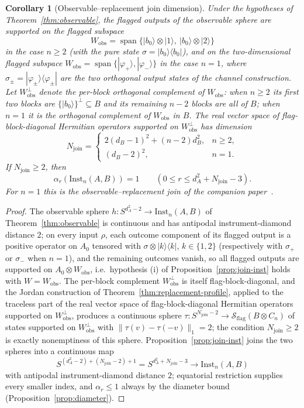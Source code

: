 \documentclass[11pt,a4paper]{article}
\newtheorem{corollary}[theorem]{Corollary}
\newcommand{\Sstate}{\mathcal{S}}
\newcommand{\Inst}{\mathrm{Inst}}
\begin{document}
\begin{corollary}[Observable--replacement join dimension]
\label{cor:join-dimension}
Under the hypotheses of Theorem~\ref{thm:observable}, the flagged outputs of the observable sphere are supported on the flagged subspace
\[
W_{\mathrm{obs}}=\operatorname{span}\{|b_0\rangle\otimes|1\rangle,\ |b_0\rangle\otimes|2\rangle\}
\]
in the case $n\ge2$ (with the pure state $\sigma=|b_0\rangle\langle b_0|$), and on the two-dimensional flagged subspace $W_{\mathrm{obs}}=\operatorname{span}\{|\varphi_+\rangle,|\varphi_-\rangle\}$ in the case $n=1$, where $\sigma_\pm=|\varphi_\pm\rangle\langle\varphi_\pm|$ are the two orthogonal output states of the channel construction. Let $W_{\mathrm{obs}}^{\perp}$ denote the per-block orthogonal complement of $W_{\mathrm{obs}}$: when $n\ge2$ its first two blocks are $\{|b_0\rangle\}^{\perp}\subseteq B$ and its remaining $n-2$ blocks are all of $B$; when $n=1$ it is the orthogonal complement of $W_{\mathrm{obs}}$ in $B$. The real vector space of flag-block-diagonal Hermitian operators supported on $W_{\mathrm{obs}}^{\perp}$ has dimension
\[
N_{\mathrm{join}}=
\begin{cases}
2(d_B-1)^2+(n-2)d_B^2,&n\ge2,\\
(d_B-2)^2,&n=1.
\end{cases}
\]
If $N_{\mathrm{join}}\ge2$, then
\[
\alpha_r(\Inst_n(A,B))=1\qquad(0\le r\le d_A^2+N_{\mathrm{join}}-3).
\]
For $n=1$ this is the observable--replacement join of the companion paper~\cite{CompanionChannels}.
\end{corollary}

\begin{proof}
The observable sphere $h:S^{d_A^2-2}\to\Inst_n(A,B)$ of Theorem~\ref{thm:observable} is continuous and has antipodal instrument-diamond distance $2$; on every input $\rho$, each outcome component of its flagged output is a positive operator on $A_0$ tensored with $\sigma\otimes|k\rangle\langle k|$, $k\in\{1,2\}$ (respectively with $\sigma_+$ or $\sigma_-$ when $n=1$), and the remaining outcomes vanish, so all flagged outputs are supported on $A_0\otimes W_{\mathrm{obs}}$, i.e.\ hypothesis (i) of Proposition~\ref{prop:join-inst} holds with $W=W_{\mathrm{obs}}$. The per-block complement $W_{\mathrm{obs}}^{\perp}$ is itself flag-block-diagonal, and the Jordan construction of Theorem~\ref{thm:replacement-profile}, applied to the traceless part of the real vector space of flag-block-diagonal Hermitian operators supported on $W_{\mathrm{obs}}^{\perp}$, produces a continuous sphere $\tau:S^{N_{\mathrm{join}}-2}\to\Sstate_{\mathrm{flag}}(B\otimes C_n)$ of states supported on $W_{\mathrm{obs}}^{\perp}$ with $\|\tau(v)-\tau(-v)\|_1=2$; the condition $N_{\mathrm{join}}\ge2$ is exactly nonemptiness of this sphere. Proposition~\ref{prop:join-inst} joins the two spheres into a continuous map
\[
S^{(d_A^2-2)+(N_{\mathrm{join}}-2)+1}=S^{d_A^2+N_{\mathrm{join}}-3}\longrightarrow\Inst_n(A,B)
\]
with antipodal instrument-diamond distance $2$; equatorial restriction supplies every smaller index, and $\alpha_r\le1$ always by the diameter bound (Proposition~\ref{prop:diameter}).
\end{proof}
\end{document}
